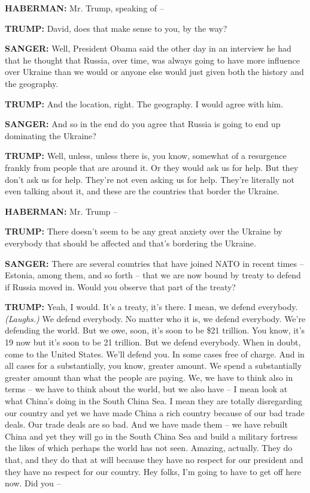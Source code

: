 \textbf{HABERMAN:} Mr. Trump, speaking of --

\textbf{TRUMP:} David, does that make sense to you, by the way?

\textbf{SANGER:} Well, President Obama said the other day in an
interview he had that he thought that Russia, over time, was always
going to have more influence over Ukraine than we would or anyone else
would just given both the history and the geography.

\textbf{TRUMP:} And the location, right. The geography. I would agree
with him.

\textbf{SANGER:} And so in the end do you agree that Russia is going to
end up dominating the Ukraine?

\textbf{TRUMP:} Well, unless, unless there is, you know, somewhat of a
resurgence frankly from people that are around it. Or they would ask us
for help. But they don't ask us for help. They're not even asking us for
help. They're literally not even talking about it, and these are the
countries that border the Ukraine.

\textbf{HABERMAN:} Mr. Trump --

\textbf{TRUMP:} There doesn't seem to be any great anxiety over the
Ukraine by everybody that should be affected and that's bordering the
Ukraine.

\textbf{SANGER:} There are several countries that have joined NATO in
recent times -- Estonia, among them, and so forth -- that we are now
bound by treaty to defend if Russia moved in. Would you observe that
part of the treaty?

\textbf{TRUMP:} Yeah, I would. It's a treaty, it's there. I mean, we
defend everybody. \emph{(Laughs.)} We defend everybody. No matter who it
is, we defend everybody. We're defending the world. But we owe, soon,
it's soon to be \$21 trillion. You know, it's 19 now but it's soon to be
21 trillion. But we defend everybody. When in doubt, come to the United
States. We'll defend you. In some cases free of charge. And in all cases
for a substantially, you know, greater amount. We spend a substantially
greater amount than what the people are paying. We, we have to think
also in terms -- we have to think about the world, but we also have -- I
mean look at what China's doing in the South China Sea. I mean they are
totally disregarding our country and yet we have made China a rich
country because of our bad trade deals. Our trade deals are so bad. And
we have made them -- we have rebuilt China and yet they will go in the
South China Sea and build a military fortress the likes of which perhaps
the world has not seen. Amazing, actually. They do that, and they do
that at will because they have no respect for our president and they
have no respect for our country. Hey folks, I'm going to have to get off
here now. Did you --

